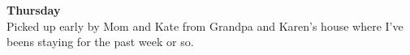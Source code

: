 \documentclass[11pt]{tufte-book}
\newenvironment{entry}[2] %
{\noindent\textbf{#2}\marginnote{#1}\\}{\vspace{0.5cm}}
\begin{document}
    \begin{entry}{\today}{Thursday}
        Picked up early by Mom and Kate from Grandpa and Karen's house where I've beens staying for the 
        past week or so.
    \end{entry}
\end{document}

